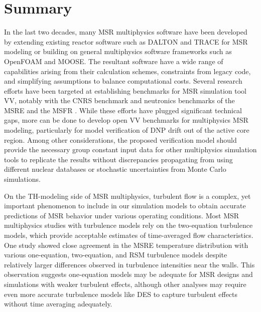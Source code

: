 \section{Summary}

In the last two decades, many \gls{MSR} multiphysics software have been developed by
extending existing reactor software such as DALTON and \gls{TRACE} for \gls{MSR} modeling or
building on general multiphysics software frameworks such as OpenFOAM and \gls{MOOSE}. The
resultant software have a wide range of capabilities arising from their calculation schemes,
constraints from legacy code, and simplifying assumptions to balance computational costs. Several
research efforts have been targeted at establishing benchmarks for \gls{MSR} simulation tool
\gls{VV}, notably with the CNRS benchmark \cite{tiberga_results_2020} and neutronics benchmarks of
the \gls{MSRE} \cite{fratoni_molten_2020} and the \gls{MSFR} \cite{brovchenko_neutronic_2019}.
While these efforts have plugged significant technical gaps, more can be done to develop open
\gls{VV} benchmarks for multiphysics \gls{MSR} modeling, particularly for model verification of
\gls{DNP} drift out of the active core region. Among other considerations, the proposed
verification model should provide the necessary group constant input data for other multiphysics
simulation tools to replicate the results without discrepancies propagating from using different
nuclear databases or stochastic uncertainties from Monte Carlo simulations.

On the \gls{TH}-modeling side of \gls{MSR} multiphysics, turbulent flow is a complex, yet important
phenomenon to include in our simulation models to obtain accurate predictions of \gls{MSR} behavior
under various operating conditions. Most \gls{MSR} multiphysics studies with turbulence models rely
on the two-equation turbulence models, which provide acceptable estimates of time-averaged flow
characteristics. One study \cite{podila_cfd_2019} showed close agreement in the \gls{MSRE}
temperature distribution with various one-equation, two-equation, and \gls{RSM} turbulence
models despite relatively larger differences observed in turbulence intensities near the walls.
This observation suggests one-equation models may be adequate for \gls{MSR} designs and simulations
with weaker turbulent effects, although other analyses may require even more accurate turbulence
models like \gls{DES} to capture turbulent effects without time averaging adequately.

